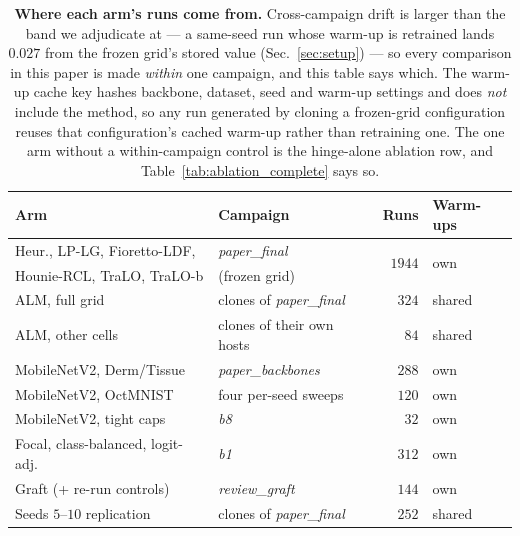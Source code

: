 \begin{table}[t]\centering\small
\setlength{\tabcolsep}{4pt}
\caption{\textbf{Where each arm's runs come from.}
Cross-campaign drift is larger than the band we adjudicate at --- a same-seed run
whose warm-up is retrained lands $0.027$ from the frozen grid's stored value
(Sec.~\ref{sec:setup}) --- so every comparison in this paper is made
\emph{within} one campaign, and this table says which. The warm-up cache key
hashes backbone, dataset, seed and warm-up settings and does \emph{not} include
the method, so any run generated by cloning a frozen-grid configuration reuses
that configuration's cached warm-up rather than retraining one. The one arm
without a within-campaign control is the hinge-alone ablation row, and
Table~\ref{tab:ablation_complete} says so.}
\label{tab:provenance}
\begin{tabular}{l l r l}
\toprule
Arm & Campaign & Runs & Warm-ups \\
\midrule
Heur., LP-LG, Fioretto-LDF,      & \emph{paper\_final} & \multirow{2}{*}{$1944$} & \multirow{2}{*}{own} \\
\;Hounie-RCL, TraLO, TraLO-b     & (frozen grid)       &                         & \\
\addlinespace[1.5pt]
ALM, full grid                   & clones of \emph{paper\_final} & $324$ & shared \\
ALM, other cells                 & clones of their own hosts & $84$ & shared \\
\addlinespace[1.5pt]
MobileNetV2, Derm/Tissue         & \emph{paper\_backbones} & $288$ & own \\
MobileNetV2, OctMNIST            & four per-seed sweeps & $120$ & own \\
MobileNetV2, tight caps          & \emph{b8} & $32$ & own \\
\addlinespace[1.5pt]
Focal, class-balanced, logit-adj.& \emph{b1} & $312$ & own \\
Graft (+ re-run controls)        & \emph{review\_graft} & $144$ & own \\
Seeds $5$--$10$ replication      & clones of \emph{paper\_final} & $252$ & shared \\
\bottomrule
\end{tabular}
\end{table}
